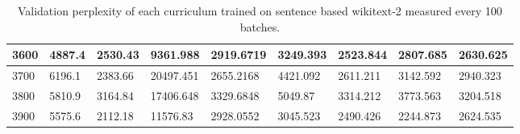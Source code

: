 \documentclass [11pt, proquest] {uwthesis}[2020/12/20]
\begin{document}
\begin{table}
\begin{tiny}
\begin{tabular}{|l|l|l|l|l|l|l|l|l|}
3600 & 4887.4 & 2530.43 & 9361.988 & 2919.6719 & 3249.393 & 2523.844 & 2807.685 & 2630.625 \\ \hline
3700 & 6196.1 & 2383.66 & 20497.451 & 2655.2168 & 4421.092 & 2611.211 & 3142.592 & 2940.323 \\ \hline
3800 & 5810.9 & 3164.84 & 17406.648 & 3329.6848 & 5049.87 & 3314.212 & 3773.563 & 3204.518 \\ \hline
3900 & 5575.6 & 2112.18 & 11576.83 & 2928.0552 & 3045.523 & 2490.426 & 2244.873 & 2624.535 \\ \hline
\end{tabular}
\caption{Validation perplexity of each curriculum trained on sentence based wikitext-2 measured every 100 batches.}
\label{tab:wikitext2-sentence-perplexity}
\end{tiny}
\end{table}
\end{document}
